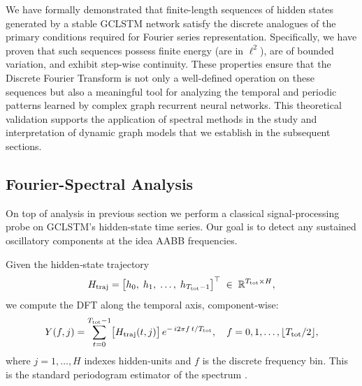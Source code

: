 \documentclass{article}
\theoremstyle{remark}
\theoremstyle{definition}
\begin{document}
We have formally demonstrated that finite-length sequences of hidden states generated by a stable GCLSTM network satisfy the discrete analogues of the primary conditions required for Fourier series representation. Specifically, we have proven that such sequences possess finite energy (are in $\ell^2$), are of bounded variation, and exhibit step-wise continuity. These properties ensure that the Discrete Fourier Transform is not only a well-defined operation on these sequences but also a meaningful tool for analyzing the temporal and periodic patterns learned by complex graph recurrent neural networks. This theoretical validation supports the application of spectral methods in the study and interpretation of dynamic graph models that we establish in the subsequent sections.



\subsection{Fourier-Spectral Analysis}

On top of analysis in previous section we perform a classical signal-processing probe on GCLSTM's hidden-state time series. Our goal is to detect any sustained oscillatory components at the idea AABB frequencies.

Given the hidden‐state trajectory
\[
  H_{\rm traj}
  = \bigl[h_0,\;h_1,\;\dots,\;h_{T_{\rm tot}-1}\bigr]^\top
  \;\in\;\mathbb{R}^{T_{\rm tot}\times H},
\]
we compute the DFT along the temporal axis, component‐wise:
\[
  Y(f,j)
  = \sum_{t=0}^{T_{\rm tot}-1}
    \bigl[H_{\rm traj}(t,j)\bigr]\,
    e^{-\,i2\pi f\,t/T_{\rm tot}},
  \quad f = 0,1,\dots,\lfloor T_{\rm tot}/2\rfloor,
\]
where \(j=1,\dots,H\) indexes hidden‐units and \(f\) is the discrete frequency bin.  This is the standard periodogram estimator of the spectrum \citep{OppenheimSchaferDSP,StoicaMosesSpectral}.
\end{document}
